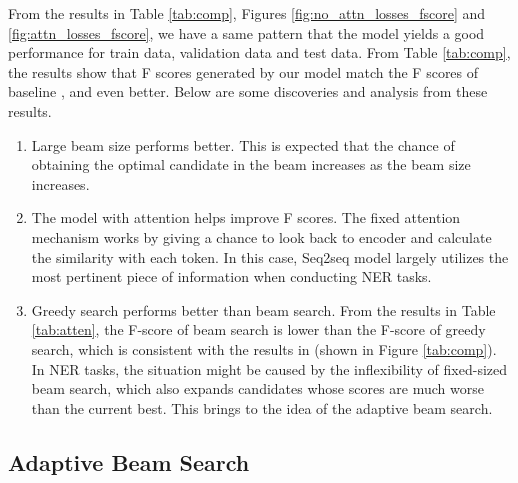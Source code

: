 \documentclass[11pt,a4paper]{article}
\begin{document}
From the results in Table \ref{tab:comp}, Figures \ref{fig:no_attn_losses_fscore} and \ref{fig:attn_losses_fscore}, we have a same pattern that the model yields a good performance  for train data, validation data and test data. From Table \ref{tab:comp}, the results show that F scores generated by our model match the F scores of baseline \cite{goyal2017continuous}, and even better. Below are some discoveries and analysis from these results. 
\begin{enumerate}
\item Large beam size performs better. This is expected that the chance of obtaining the optimal candidate in the beam increases as the beam size increases.
\item The model with attention helps improve F scores. The fixed attention mechanism works by giving a chance to look back to encoder and calculate the similarity with each token. In this case, Seq2seq model largely utilizes the most pertinent piece of information when conducting NER tasks.

\item Greedy search performs better than beam search. From the results in Table \ref{tab:atten}, the F-score of beam search is lower than the F-score of greedy search, which is consistent with the results in \citet{goyal2017continuous} (shown in Figure \ref{tab:comp}). In NER tasks, the situation might be caused by the inflexibility of fixed-sized beam search, which also expands candidates whose scores are much
worse than the current best. This brings to the idea of the adaptive beam search. 

\end{enumerate}


\subsection{Adaptive Beam Search} \label{sec:adaptive}
\end{document}
